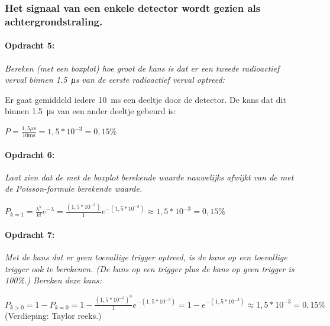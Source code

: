 \subsubsection{Het signaal van een enkele detector wordt gezien als achtergrondstraling.}

\begin{minipage}[t]{1\columnwidth}%

\paragraph{Opdracht 5:}

\textit{Bereken (met een boxplot) hoe groot de kans is dat er een
tweede radioactief verval binnen \SI{1.5}{\micro\second} van de eerste
radioactief verval optreed:}

\bigskip{}

Er gaat gemiddeld iedere \SI{10}{\milli\second} een deeltje door
de detector. De kans dat dit binnen \SI{1.5}{\micro\second} van een
ander deeltje gebeurd is:

\bigskip{}

$P=\frac{1,5\mu\mathrm{s}}{10\mathrm{ms}}=1,5*10^{-3}=0,15\%$%
\end{minipage}

\bigskip{}

\begin{minipage}[t]{1\columnwidth}%

\paragraph{Opdracht 6:}

\textit{Laat zien dat de met de boxplot berekende waarde nauwelijks
afwijkt van de met de Poisson-formule berekende waarde.}

\bigskip{}

$P_{k=1}=\frac{\lambda^{k}}{k!}e^{-\lambda}=\frac{\left(1,5*10^{-3}\right)}{1}e^{-\left(1,5*10^{-3}\right)}\approx1,5*10^{-3}=0,15\%$%
\end{minipage}

\bigskip{}

\begin{minipage}[t]{1\columnwidth}%

\paragraph{Opdracht 7:}

\textit{Met de kans dat er geen toevallige trigger optreed, is de
kans op een toevallige trigger ook te berekenen. (De kans op een trigger
plus de kans op geen trigger is 100\%.) Bereken deze kans:}

\bigskip{}

$P_{k>0}=1-P_{k=0}=1-\frac{\left(1,5*10^{-3}\right)^{0}}{1}e^{-\left(1,5*10^{-3}\right)}=1-e^{-\left(1,5*10^{-3}\right)}\approx1,5*10^{-3}=0,15\%$
(Verdieping: Taylor reeks.)%
\end{minipage}

